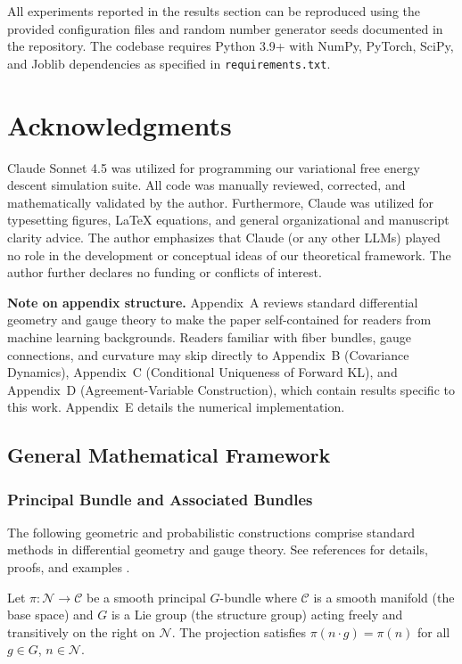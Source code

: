 \documentclass[twoside,11pt]{article}
\begin{document}
All experiments reported in the results section can be reproduced using the provided configuration files and random number generator seeds documented in the repository. The codebase requires Python 3.9+ with NumPy, PyTorch, SciPy, and Joblib dependencies as specified in \texttt{requirements.txt}.



\section*{Acknowledgments}
Claude Sonnet 4.5 was utilized for programming our variational free energy descent simulation suite.  All code was manually reviewed, corrected, and mathematically validated by the author.  Furthermore, Claude was utilized for typesetting figures, LaTeX equations, and general organizational and manuscript clarity advice.  The author emphasizes that Claude (or any other LLMs) played no role in the development or conceptual ideas of our theoretical framework. The author further declares no funding or conflicts of interest.

\appendix

\textbf{Note on appendix structure.} Appendix~A reviews standard differential geometry and gauge theory to make the paper self-contained for readers from machine learning backgrounds. Readers familiar with fiber bundles, gauge connections, and curvature may skip directly to Appendix~B (Covariance Dynamics), Appendix~C (Conditional Uniqueness of Forward KL), and Appendix~D (Agreement-Variable Construction), which contain results specific to this work. Appendix~E details the numerical implementation.

\subsection{General Mathematical Framework}
\subsubsection{Principal Bundle and Associated Bundles}

The following geometric and probabilistic constructions comprise standard methods in differential geometry and gauge theory.  See references for details, proofs, and examples \citep{nakahara2003geometry,frankel2011geometry,blei2017variational,amari2016information}.

Let $\pi: \mathcal{N} \to \mathcal{C}$ be a smooth principal $G$-bundle where $\mathcal{C}$ is a smooth manifold (the base space) and $G$ is a Lie group (the structure group) acting freely and transitively on the right on $\mathcal{N}$. The projection satisfies $\pi(n \cdot g) = \pi(n)$ for all $g \in G$, $n \in \mathcal{N}$.
\end{document}
